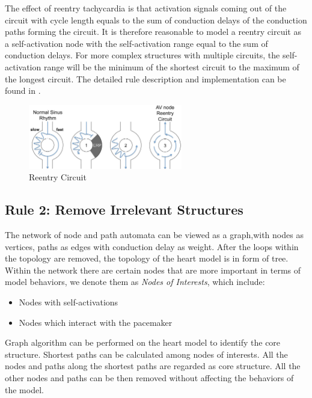 The effect of reentry tachycardia is that activation signals coming out of the circuit with cycle length equals to the sum of conduction delays of the conduction paths forming the circuit. It is therefore reasonable to model a reentry circuit as a self-activation node with the self-activation range equal to the sum of conduction delays. For more complex structures with multiple circuits, the self-activation range will be the minimum of the shortest circuit to the maximum of the longest circuit. The detailed rule description and implementation can be found in \cite{regar_tech}.
\begin{figure}[!h]
		\centering
		\includegraphics[width=0.6\textwidth]{figs/reentry.pdf}
		\caption{\small Reentry Circuit}
		\label{fig:reentry}
\end{figure}

\subsection{Rule 2: Remove Irrelevant Structures}
The network of node and path automata can be viewed as a graph,with nodes as vertices, paths as edges with conduction delay as weight. After the loops within the topology are removed, the topology of the heart model is in form of tree. Within the network there are certain nodes that are more important in terms of model behaviors, we denote them as \emph{Nodes of Interests}, which include:
\begin{itemize}
	\item Nodes with self-activations
	\item Nodes which interact with the pacemaker
\end{itemize}
Graph algorithm can be performed on the heart model to identify the core structure. Shortest paths can be calculated among nodes of interests. All the nodes and paths along the shortest paths are regarded as core structure. All the other nodes and paths can be then removed without affecting the behaviors of the model. 
